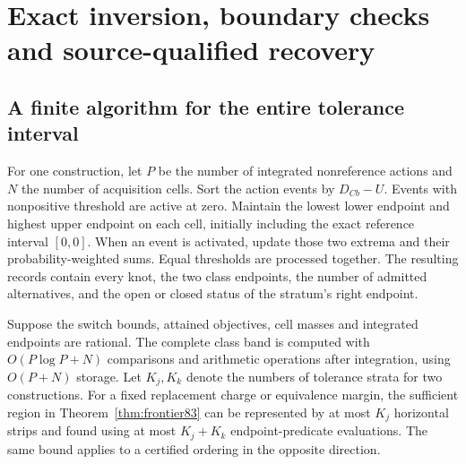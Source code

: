 \section{Exact inversion, boundary checks and source-qualified recovery}\label{app:frontier83}
\subsection{A finite algorithm for the entire tolerance interval}
For one construction, let $P$ be the number of integrated nonreference actions and $N$ the number of acquisition cells. Sort the action events by $D_{Cb}-U$. Events with nonpositive threshold are active at zero. Maintain the lowest lower endpoint and highest upper endpoint on each cell, initially including the exact reference interval $[0,0]$. When an event is activated, update those two extrema and their probability-weighted sums. Equal thresholds are processed together. The resulting records contain every knot, the two class endpoints, the number of admitted alternatives, and the open or closed status of the stratum's right endpoint.

\begin{proposition}\label{prop:inversion83}
Suppose the switch bounds, attained objectives, cell masses and integrated endpoints are rational. The complete class band is computed with $O(P\log P+N)$ comparisons and arithmetic operations after integration, using $O(P+N)$ storage. Let $K_j,K_k$ denote the numbers of tolerance strata for two constructions. For a fixed replacement charge or equivalence margin, the sufficient region in Theorem~\ref{thm:frontier83} can be represented by at most $K_j$ horizontal strips and found using at most $K_j+K_k$ endpoint-predicate evaluations. The same bound applies to a certified ordering in the opposite direction.
\end{proposition}

